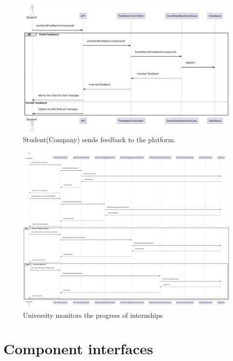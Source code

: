 \newpage
{}

\begin{figure}[ht!]
    \centering
    \includegraphics[scale=0.4]{Images/ImagesSequenceDiagram/SendFeebackSD.png}
    \caption{Student(Company) sends feedback to the platform.}
\end{figure}


\newpage

\begin{figure}[ht!]
    \centering
    \includegraphics[scale=0.21]{Images/ImagesSequenceDiagram/UniversityMonitorsInternship.png}
    \caption{University monitors the progress of internships}
\end{figure}

\newpage

\section{Component interfaces}

